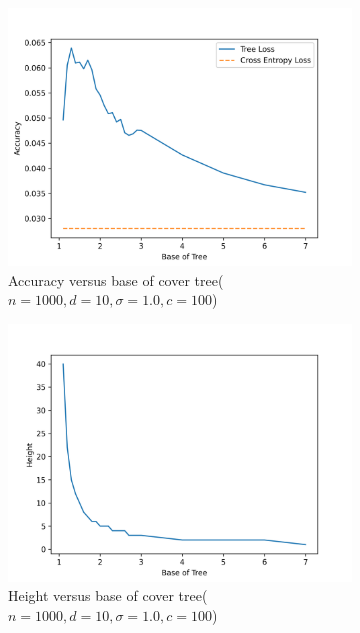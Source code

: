 \documentclass[twoside]{article}
\theoremstyle{definition}
\begin{document}
\begin{figure}
        \centering
        \begin{subfigure}[b]{0.45\textwidth}
            \centering
            \includegraphics[width=\textwidth]{fig/new_img/accuracy_vs_base.png}
            {{\small Accuracy versus base of cover tree($n=1000, d=10, \sigma=1.0, c=100$)}}
            \label{subfig.1}
        \end{subfigure}
        \hfill
        \begin{subfigure}[b]{0.45\textwidth}  
            \centering 
            \includegraphics[width=\textwidth]{fig/new_img/height_vs_base.png}
            {{\small Height versus base of cover tree($n=1000, d=10, \sigma=1.0, c=100$)}}   

\end{subfigure}
\end{figure}
\end{document}
